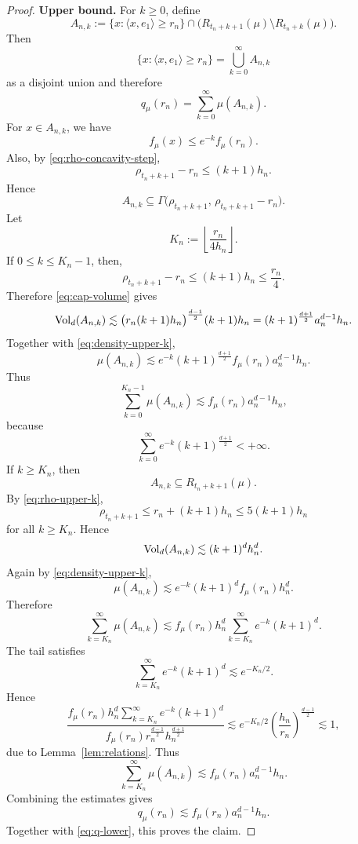\documentclass[10pt]{amsart}
\newcommand{\1}{\textbf{1}}
\newcommand{\vol}{{\rm Vol}}
\numberwithin{equation}{section} %
\theoremstyle{remark}
\theoremstyle{definition}
\begin{document}
\begin{proof}
\noindent\textbf{Upper bound.}
For \(k\ge0\), define
\[
A_{n,k}:=
\{x:\langle x,e_1\rangle\ge r_n\}
\cap
\bigl(R_{t_n+k+1}(\mu)\setminus R_{t_n+k}(\mu)\bigr).
\]
Then
\[
\{x:\langle x,e_1\rangle\ge r_n\}
=
\bigcup_{k=0}^\infty A_{n,k}
\]
as a disjoint union and therefore
\[
q_\mu(r_n)=\sum_{k=0}^\infty \mu(A_{n,k}).
\]
For \(x\in A_{n,k}\), we have
\begin{equation}\label{eq:density-upper-k}
f_\mu(x)\le e^{-k}f_\mu(r_n).
\end{equation}
Also, by \eqref{eq:rho-concavity-step},
\begin{equation}\label{eq:rho-upper-k}
\rho_{t_n+k+1}-r_n\le (k+1)h_n.
\end{equation}
Hence
\[
A_{n,k}
\subseteq
\Gamma\bigl(\rho_{t_n+k+1},\,\rho_{t_n+k+1}-r_n\bigr).
\]
Let
\[
K_n:=\left\lfloor \frac{r_n}{4h_n}\right\rfloor.
\]
If \(0\le k\le K_n-1\), then, 
\[
\rho_{t_n+k+1}-r_n\le (k+1)h_n\le \frac{r_n}{4}.
\]
Therefore \eqref{eq:cap-volume} gives
\[
\vol_d(A_{n,k})
\lesssim
\bigl(r_n(k+1)h_n\bigr)^{\frac{d-1}{2}}(k+1)h_n
=
(k+1)^{\frac{d+1}{2}}a_n^{d-1}h_n.
\]
Together with \eqref{eq:density-upper-k},
\begin{equation}\label{eq:upper-small-k}
\mu(A_{n,k})
\lesssim
e^{-k}(k+1)^{\frac{d+1}{2}}
f_\mu(r_n)a_n^{d-1}h_n.
\end{equation}
Thus
\[
\sum_{k=0}^{K_n-1}\mu(A_{n,k})
\lesssim
f_\mu(r_n)a_n^{d-1}h_n,
\]
because
\[
\sum_{k=0}^\infty e^{-k}(k+1)^{\frac{d+1}{2}}<+\infty.
\]
If \(k \geq K_n\), then
\[
A_{n,k}\subseteq R_{t_n+k+1}(\mu).
\]
By \eqref{eq:rho-upper-k},
\[
\rho_{t_n+k+1}\le r_n+(k+1)h_n\leq 5(k+1)h_n
\]
for all \(k \geq K_n\). Hence
\[
\vol_d(A_{n,k})
\lesssim
(k+1)^d h_n^d.
\]
Again by \eqref{eq:density-upper-k},
\begin{equation}\label{eq:upper-large-k}
\mu(A_{n,k})
\lesssim
e^{-k}(k+1)^d f_\mu(r_n)h_n^d.
\end{equation}
Therefore
\[
\sum_{k=K_n}^{\infty}\mu(A_{n,k})
\lesssim
f_\mu(r_n)h_n^d
\sum_{k=K_n}^{\infty} e^{-k}(k+1)^d.
\]
The tail satisfies
\[
\sum_{k=K_n}^{\infty} e^{-k}(k+1)^d
\lesssim e^{-K_n/2}.
\]
 Hence
\[
\frac{
f_\mu(r_n)h_n^d
\sum_{k=K_n}^{\infty} e^{-k}(k+1)^d
}{
f_\mu(r_n)r_n^{\frac{d-1}{2}}h_n^{\frac{d+1}{2}}
}
\lesssim
e^{-K_n/2}
\left(\frac{h_n}{r_n}\right)^{\frac{d-1}{2}} \lesssim 1,
\]  due to Lemma~\ref{lem:relations}.
Thus
\[
\sum_{k=K_n}^{\infty}\mu(A_{n,k})
\lesssim f_\mu(r_n)a_n^{d-1}h_n.
\]
Combining the estimates gives
\begin{equation}\label{eq:q-upper}
q_\mu(r_n)\lesssim f_\mu(r_n)a_n^{d-1}h_n.
\end{equation}
Together with \eqref{eq:q-lower}, this proves the claim.
\end{proof}
\end{document}
